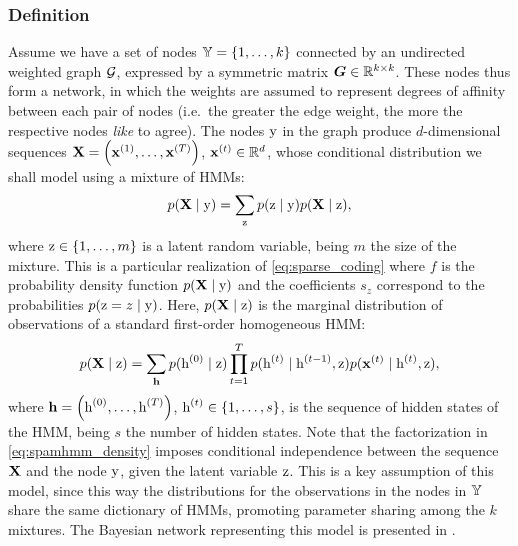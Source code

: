 \subsubsection{Definition}
\label{sec:spamhmm_definition}
Assume we have a set of nodes ${\mathbb{Y}}=\{1, \dots, k\}$ connected by an undirected weighted graph ${\mathcal{G}}$, expressed by a symmetric matrix ${\bm{G}} \in \mathbb{R}^{k \times k}$. These nodes thus form a network, in which the weights are assumed to represent degrees of affinity between each pair of nodes (i.e.\ the greater the edge weight, the more the respective nodes \textit{like} to agree). The nodes ${\textnormal{y}}$ in the graph produce $d$-dimensional sequences ${\mathbf{X}} = \left({\mathbf{x}}^{(1)}, \dots,{\mathbf{x}}^{(T)} \right)$, ${\mathbf{x}}^{(t)} \in \mathbb{R}^d$, whose conditional distribution we shall model using a mixture of HMMs:
\begin{equation}
\label{eq:spamhmm_density}
p({\mathbf{X}} \mid {\textnormal{y}}) = \sum_{{\textnormal{z}}} p({\textnormal{z}}\mid{\textnormal{y}}) p({\mathbf{X}} \mid {\textnormal{z}}),
\end{equation}
where ${\textnormal{z}} \in \{1, \dots, m\}$ is a latent random variable, being $m$ the size of the mixture. This is a particular realization of \eqref{eq:sparse_coding} where $f$ is the probability density function $p({\mathbf{X}} \mid {\textnormal{y}})$ and the coefficients $s_z$ correspond to the probabilities $p({\textnormal{z}} = z \mid {\textnormal{y}})$. Here, $p({\mathbf{X}} \mid {\textnormal{z}})$ is the marginal distribution of observations of a standard first-order homogeneous HMM:
\begin{equation}
\label{eq:spamhmm_hmm}
p({\mathbf{X}} \mid {\textnormal{z}}) = \sum_{{\mathbf{h}}} p({\textnormal{h}}^{(0)}\mid{\textnormal{z}}) \prod_{t=1}^T p({\textnormal{h}}^{(t)}\mid{\textnormal{h}}^{(t-1)},{\textnormal{z}}) p({\mathbf{x}}^{(t)}\mid{\textnormal{h}}^{(t)},{\textnormal{z}}),
\end{equation}
where ${\mathbf{h}} = \left({\textnormal{h}}^{(0)}, \dots,{\textnormal{h}}^{(T)} \right)$, ${\textnormal{h}}^{(t)} \in \{1, \dots, s\}$, is the sequence of hidden states of the HMM, being $s$ the number of hidden states. Note that the factorization in \eqref{eq:spamhmm_density} imposes conditional independence between the sequence ${\mathbf{X}}$ and the node ${\textnormal{y}}$, given the latent variable ${\textnormal{z}}$. This is a key assumption of this model, since this way the distributions for the observations in the nodes in ${\mathbb{Y}}$ share the same dictionary of HMMs, promoting parameter sharing among the $k$ mixtures. The Bayesian network representing this model is presented in .

